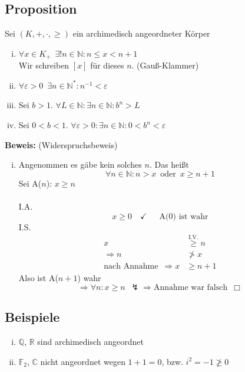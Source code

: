 \subsection{Proposition} %
\label{sub:proposition}
Sei $(K,+,\cdot, \geq)$ ein archimedisch angeordneter Körper
\begin{enumerate}[(i)]
	\item $ \forall x \in K_+ \enspace \exists ! n \in \mathds{N} : n \leq x < n+1$ \\
	Wir schreiben $[x]$ für dieses $n$. (Gauß-Klammer)
	\item $\forall \varepsilon > 0 \enspace \exists n \in \mathds{N}^* : n^{-1} < \varepsilon $
	\item Sei $b>1$. $\forall L \in \mathds{N} : \exists n \in \mathds{N} : b^n > L$
	\item Sei $0<b<1$. $ \forall \varepsilon > 0 : \exists n \in \mathds{N} : 0<b^n < \varepsilon$
\end{enumerate}
\textbf{Beweis:} (Widerspruchsbeweis)
\begin{enumerate}[(i)]
	\item Angenommen es gäbe kein solches $n$. Das heißt
	\[
		\forall n \in \mathds{N} : n>x 	\enspace \text{oder} \enspace x \geq n+1
	\]
	Sei A($n$): \quad $x \geq n$ \\
	\vspace{\baselineskip} \\
	I.A. 
	\[
		x \geq 0 \quad \checkmark \quad \enspace \text{A(0) ist wahr}  	
	\]
	I.S.
	\begin{align*}
		x &\overset{\text{I.V.}}{\geq} n \\
		\Rightarrow n &\not> x \\
		\text{nach Annahme} \enspace \Rightarrow x &\geq n+1
	\end{align*}
	Also ist A($n+1$) wahr
	\[
		\Longrightarrow \forall n : x \geq n \enspace \lightning \Longrightarrow \text{Annahme war falsch} \enspace \Box
	\]
\end{enumerate}

\subsection{Beispiele} %
\label{sub:beispiele}
\begin{enumerate}[(i)]
	\item $\mathds{Q}$, $\mathds{R}$ sind archimedisch angeordnet
	\item $\mathds{F}_2$, $\mathds{C}$ nicht angeordnet wegen $1+1=0$, bzw. $i^2 = -1 \not\geq 0$
\end{enumerate}

